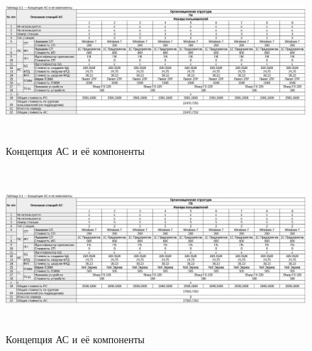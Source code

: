 \documentclass[12pt, a4paper, simple]{eskdtext}
\begin{document}
    \begin{figure}[!hp]
        \centering
        \includegraphics[height=6cm]
            {_docs/Таблица3-1КонцепцияАСИЕеКомпонентыП4.jpg}
        \caption{Концепция АС и её компоненты}
    \end{figure}

    \begin{figure}[!hp]
        \centering
        \includegraphics[height=6cm]
            {_docs/Таблица3-1КонцепцияАСИЕеКомпонентыП5.jpg}
        \caption{Концепция АС и её компоненты}
    \end{figure}

\end{document}
